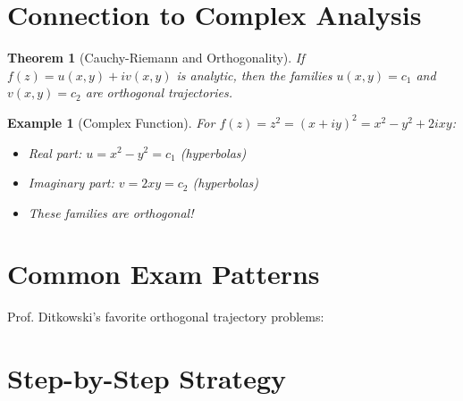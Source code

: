 \documentclass[12pt]{article}
\newtheorem{theorem}{Theorem}
\newtheorem{example}{Example}
\begin{document}
\section{Connection to Complex Analysis}

\begin{theorem}[Cauchy-Riemann and Orthogonality]
If $f(z) = u(x,y) + iv(x,y)$ is analytic, then the families $u(x,y) = c_{1}$ and $v(x,y) = c_{2}$ are orthogonal trajectories.
\end{theorem}

\begin{example}[Complex Function]
For $f(z) = z^{2} = (x+iy)^{2} = x^{2} - y^{2} + 2ixy$:
\begin{itemize}
    \item Real part: $u = x^{2} - y^{2} = c_{1}$ (hyperbolas)
    \item Imaginary part: $v = 2xy = c_{2}$ (hyperbolas)
    \item These families are orthogonal!
\end{itemize}
\end{example}

\section{Common Exam Patterns}

\begin{examtip}
Prof. Ditkowski's favorite orthogonal trajectory problems:
\end{examtip}

\section{Step-by-Step Strategy}
\end{document}
